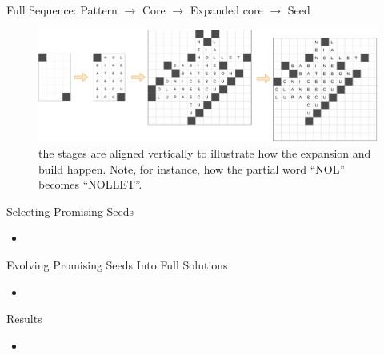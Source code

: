\documentclass[aspectratio=169,usenames,dvipsnames]{beamer}
\newcommand{\bei}{\begin{itemize}}
\newcommand{\eei}{\end{itemize}}
\newcommand{\ie}{\item}
\numberwithin{equation}{section}
\numberwithin{theorem}{section}
\numberwithin{lem}{section}
\numberwithin{df}{section}
\begin{document}
\begin{frame}{Full Sequence: Pattern $\rightarrow$ Core $\rightarrow$ Expanded core $\rightarrow$ Seed}

\begin{figure}
\includegraphics[width=\textwidth]{figs/4part.pdf}
\caption{the stages are aligned vertically to illustrate how the expansion and build happen. Note, for instance, how the partial word ``NOL'' becomes ``NOLLET''. }
\label{fig:pattern}
\end{figure}

\end{frame}


\begin{frame}{Selecting Promising Seeds}

\bei

\ie 

\bigskip

\eei


\end{frame}


\begin{frame}{Evolving Promising Seeds Into Full Solutions}

\bei

\ie 

\bigskip

\eei


\end{frame}



\begin{frame}{Results}

\bei

\ie 

\bigskip

\eei


\end{frame}
\end{document}
